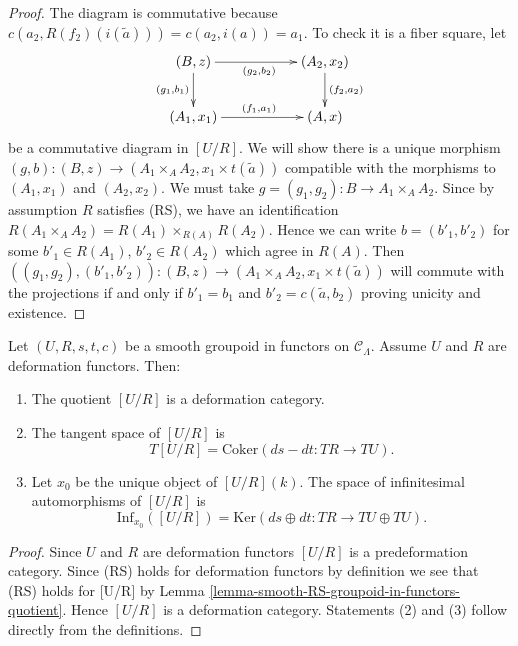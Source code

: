 \begin{proof}
\medskip \noindent
The diagram is commutative because
$c(a_2, R(f_2)(i(\widetilde{a}))) = c(a_2, i(a)) = a_1$.
To check it is a fiber square, let
$$
\xymatrix{
(B, z) \ar[d]_{(g_1, b_1)} \ar[rr]_{(g_2, b_2)} & & (A_2, x_2)
\ar[d]^{(f_2, a_2)} \\
(A_1, x_1) \ar[rr]^{(f_1, a_1)} && (A, x)
}
$$
be a commutative diagram in $[U/R]$. We will show there is a unique morphism
$(g, b) : (B, z) \to (A_1 \times_A A_2, x_1 \times t(\widetilde{a}))$
compatible with the morphisms to $(A_1, x_1)$ and $(A_2, x_2)$.
We must take $g = (g_1, g_2) : B \to A_1 \times_A A_2$.
Since by assumption $R$ satisfies (RS), we have an identification
$R(A_1 \times_A A_2) = R(A_1) \times_{R(A)} R(A_2)$.
Hence we can write $b = (b'_1, b'_2)$ for some
$b'_1 \in R(A_1)$, $b'_2 \in R(A_2)$ which agree in $R(A)$.
Then
$((g_1, g_2), (b'_1, b'_2)) : (B, z) \to
(A_1 \times_A A_2, x_1 \times t(\widetilde{a}))$
will commute with the projections if and only if
$b'_1 = b_1$ and $b'_2 = c(\widetilde{a}, b_2)$ proving unicity and
existence.
\end{proof}

\begin{lemma}
\label{lemma-deformation-groupoid-quotient}
Let $(U, R, s, t, c)$ be a smooth groupoid in functors on $\mathcal{C}_\Lambda$.
Assume $U$ and $R$ are deformation functors. Then:
\begin{enumerate}
\item The quotient $[U/R]$ is a deformation category.
\item The tangent space of $[U/R]$ is
$$
T[U/R] = \text{Coker}(ds-dt: TR \to TU).
$$
\item Let $x_0$ be the unique object of $[U/R](k)$.  The space of infinitesimal
automorphisms of $[U/R]$ is
$$
\text{Inf}_{x_0}([U/R]) =
\text{Ker}(ds \oplus dt : TR \to TU \oplus TU).
$$
\end{enumerate}
\end{lemma}

\begin{proof}
Since $U$ and $R$ are deformation functors $[U/R]$ is a predeformation
category. Since (RS) holds for deformation functors by
definition we see that (RS) holds for [U/R] by
Lemma \ref{lemma-smooth-RS-groupoid-in-functors-quotient}.
Hence $[U/R]$ is a deformation category. Statements (2) and (3)
follow directly from the definitions.
\end{proof}







